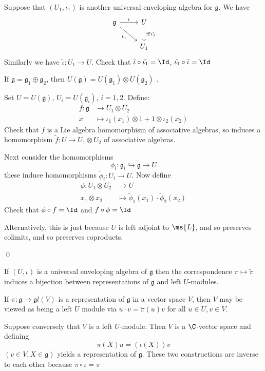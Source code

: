 \documentclass[x11names,reqno,14pt]{extarticle}
\newcommand{\mk}[1]{\mathfrak{#1}}
\newcommand{\g}{\mk{g}}
\newcommand{\tphi}{\tilde{\phi}}
\newcommand{\into}{\hookrightarrow}
\begin{document}
Suppose that $(U_1, \iota_1)$ is another universal enveloping algebra for $\g$. We have
\[
\begin{tikzcd}
\g \ar[r, "\iota"] \ar[dr, "\iota_1"'] & U \ar[d, dotted, "\exists!\tilde{\iota_1}"] \\
& U_1
\end{tikzcd}
\]
Similarly we have $\tilde{\iota}:U_1\to U$. Check that $\tilde{\iota}\circ\tilde{\iota_1} = \Id$, $\tilde{\iota_1}\circ\tilde{\iota} = \Id$

\thm

If $\g = \g_1\oplus\g_2$, then $U(\g) = U(\g_1)\otimes U(\g_2)$ . 

\proof

Set $U = U(\g)$, $U_i = U(\g_i)$, $i = 1, 2$. Define:
\begin{align*}
f:\g&\to U_1\otimes U_2 \\
x & \mapsto \iota_1(x_1)\otimes 1 + 1\otimes\iota_2(x_2)
\end{align*}
Check that $f$ is a Lie algebra homomorphism of associative algebras, so induces a homomorphism $\tilde{f}:U\to U_1\otimes U_2$ of associative algebras. 

Next consider the homomorphisms
\[
\phi_i: \g_i \into \g \to U
\]
these induce homomorphisms $\tphi_i:U_i\to U$. Now define
\begin{align*}
\phi: U_1\otimes U_2 & \to U \\
x_1\otimes x_2 & \mapsto \tphi_1(x_1)\cdot\tphi_2(x_2)
\end{align*}
Check that $\phi\circ\tilde{f} = \Id$ and $\tilde{f}\circ\phi = \Id$

Alternatively, this is just because $U$ is left adjoint to $\ms{L}$, and so preserves colimits, and so preserves coproducts. 

\qed

\thm

If $(U, \iota)$ is a universal enveloping algebra of $\g$ then the correspondence $\pi\mapsto\tilde{\pi}$ induces a bijection between  representations of $\g$ and left $U$-modules. 

\proof

If $\pi:\g\to\g l(V)$ is a representation of $\g$ in a vector space $V$, then $V$ may be viewed as being a left $U$ module via $u\cdot v = \tilde{\pi}(u)v$ for all $u \in U, v \in V$. 

Suppose conversely that $V$ is a left $U$-module. Then $V$ is a $\C$-vector space and defining
\[
\pi(X)u = (\iota(X))v
\]
$(v\in V, X \in \g)$ yields a representation of $\g$. These two constructions are inverse to each other because $\tilde{\pi} \circ \iota = \pi$
\end{document}
